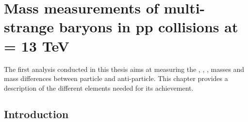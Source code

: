 \chapter{Mass measurements of multi-strange baryons in pp collisions at \sqrtS = 13 TeV}
\label{chap:CPTAnalysis}

The first analysis conducted in this thesis aims at measuring the \rmXiM, \rmAxiP, \rmOmegaM, \rmAomegaP masses and mass differences between particle and anti-particle. This chapter provides a description of the different elements needed for its achievement. 


\section{Introduction}


